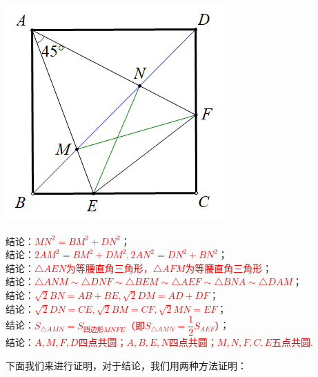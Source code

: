 \vspace{2em}
\begin{minipage}{0.25\textwidth}
	\includegraphics[scale=0.5]{figure/banjiao07.png}
\end{minipage}
\begin{minipage}{0.75\textwidth}
结论：\textcolor{red}{$MN^2=BM^2+DN^2$}；\\
结论：\textcolor{red}{$2AM^2=BM^2+DM^2,2AN^2=DN^2+BN^2$}；\\
结论：\textcolor{red}{$\triangle AEN$为等腰直角三角形，$\triangle AFM$为等腰直角三角形}；\\
结论：\textcolor{red}{$\triangle ANM \sim \triangle DNF \sim \triangle BEM \sim \triangle AEF \sim \triangle BNA \sim \triangle DAM$}；\\
结论：\textcolor{red}{$\sqrt{2}BN=AB+BE,\sqrt{2}DM=AD+DF$}；\\
结论：\textcolor{red}{$\sqrt{2}DN=CE,\sqrt{2}BM=CF,\sqrt{2}MN=EF$}；\\
结论：\textcolor{red}{$S_{\triangle AMN}=S_{\text{四边形}MNFE}$（即$S_{\triangle AMN}=\dfrac{1}{2}S_{AEF}$）}；\\
结论：\textcolor{red}{$A,M,F,D$四点共圆；$A,B,E,N$四点共圆；$M,N,F,C,E$五点共圆}.
\end{minipage}
\vspace{2em}

下面我们来进行证明，对于结论，我们用两种方法证明：

